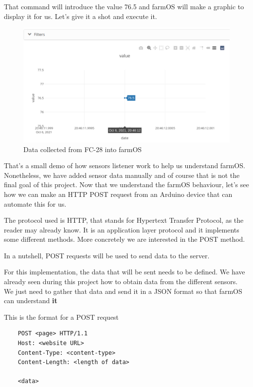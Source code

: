 That command will introduce the value 76.5 and farmOS will make a graphic to display it for us. Let's give it a shot and execute it.

\begin{figure}[H]
    \centering
    \includegraphics[width=1\textwidth]{fig/drupal-install/sensor-data-graphic.png}
    \caption{Data collected from FC-28 into farmOS}
    \label{fig:sensor-data-graphic}
\end{figure}

That's a small demo of how sensors listener work to help us understand farmOS. Nonetheless, we have added sensor data manually and of course that is not the final goal of this project. Now that we understand the farmOS behaviour, let's see how we can make an HTTP POST request from an Arduino device that can automate this for us.

The protocol used is HTTP, that stands for Hypertext Transfer Protocol, as the reader may already know. It is an application layer protocol and it implements some different methods. More concretely we are interested in the POST\cite{post} method.

In a nutshell, POST requests will be used to send data to the server.

For this implementation, the data that will be sent needs to be defined. We have already seen during this project how to obtain data from the different sensors. We just need to gather that data and send it in a JSON format so that farmOS can understand \textbf{it}

\vspace{5mm}
This is the format for a POST request
\begin{verbatim}
    POST <page> HTTP/1.1
    Host: <website URL>
    Content-Type: <content-type>
    Content-Length: <length of data>

    <data>
\end{verbatim}

